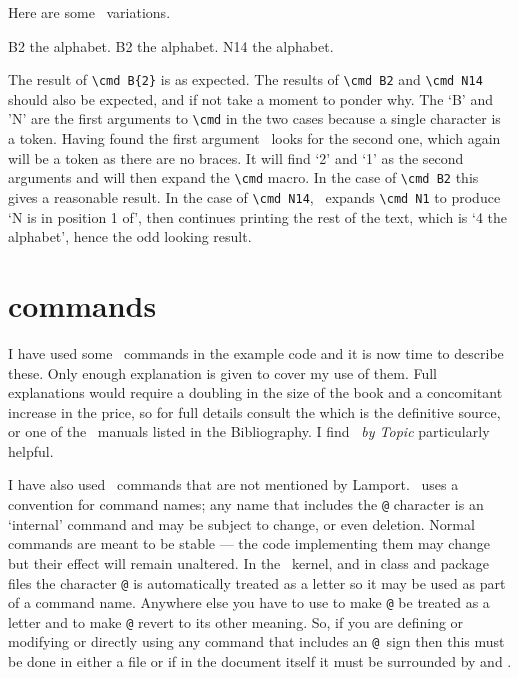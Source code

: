     Here are some \tx\ variations.
\begin{lcode}
\cmd B{2} the alphabet. %
\cmd B2 the alphabet.   %
\cmd N14 the alphabet.  %
\end{lcode}
The result of \verb?\cmd B{2}? is as expected. The results of \verb?\cmd B2?
and \verb?\cmd N14? should also be expected, and if not take a moment to
ponder why. The `B' and 'N' are the first arguments to \verb?\cmd? in the
two cases because a single character is a token. Having found the first
argument \tx\ looks for the second one, which again will be a token as
there are no braces. It will find `2' and `1' as the second arguments
and will then expand the \verb?\cmd? macro. In the case of \verb?\cmd B2? this
gives a reasonable result. In the case of \verb?\cmd N14?, \tx\ expands
\verb?\cmd N1? to produce `N is in position 1 of', then continues printing
the rest of the text, which is `4 the alphabet', hence the odd looking
result.


\section{\alltx{} commands} \label{sec:alltexcommands}

    I have used some \tx\ commands in the example code and it is now time
to describe these. Only enough explanation is given to cover my use of
them. Full explanations would require a doubling in the size of the book 
and a concomitant increase in the price, so for full details consult
the \textit{\txbook} which is the definitive source, or one of the \tx\ 
manuals listed in the Bibliography. I find \textit{\tx\ by Topic}
particularly helpful.

    I have also used \ltx\ commands that are not mentioned by
Lamport. \ltx\ uses a convention for command names; any name that
includes the \texttt{@} character is an `internal' command and may be 
subject to change, or even deletion. Normal commands are meant to be 
stable --- the code implementing them may change but their effect will 
remain unaltered. In the \ltx\ kernel, and in class and package files 
the character \texttt{@} is automatically
treated as a letter so it may be used as part of a command name. 
Anywhere else you have to use 
\cmd{\makeatletter} to make \texttt{@} be treated as a letter and 
\cmd{\makeatother} to make \texttt{@} revert to its other meaning.
So, if you are defining or modifying or directly using any command 
that includes an \texttt{@}\idxatincode\
sign then this must be done in either a  file or if in the 
document itself it must be surrounded by \cmd{\makeatletter} and 
\cmd{\makeatother}. 


